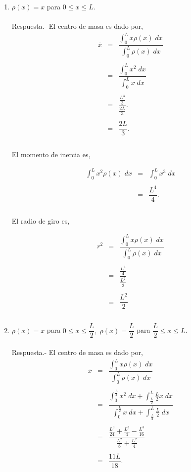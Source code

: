 \begin{enumerate}[\bfseries 1.]
\item $\rho(x)=x$ para $0\leq x \leq L$.\\\\
    Respuesta.-\; El centro de masa es dado por,
    $$\begin{array}{rcl}
	\overline{x}&=&\dfrac{\int_0^L x\rho(x)\; dx}{\int_0^L \rho(x)\; dx}\\\\
		    &=&\dfrac{\int_0^L x^2\; dx}{\int_0^L x\; dx}\\\\
		    &=&\dfrac{\frac{L^3}{3}}{\frac{2L}{3}}.\\\\
		    &=&\dfrac{2L}{3}.\\\\
    \end{array}$$

    El momento de inercia es,

    $$\begin{array}{rcl}
	\displaystyle\int_0^L x^2 \rho(x)\; dx&=&\displaystyle\int_0^L x^3\; dx\\\\
					      &=&\dfrac{L^4}{4}.\\\\
    \end{array}$$

    El radio de giro es,

    $$\begin{array}{rcl}
	r^2&=&\dfrac{\int_0^L x\rho(x)\; dx}{\int_0^L \rho(x)\; dx}\\\\
	   &=&\dfrac{\frac{L^4}{4}}{\frac{L^2}{2}}\\\\
	   &=&\dfrac{L^2}{2}\\\\
    \end{array}$$

\item $\rho(x)=x$ para $0\leq x \leq \dfrac{L}{2},$ $\rho(x)=\dfrac{L}{2}$ para $\dfrac{L}{2}\leq x \leq L$.\\\\ 
    Respuesta.-\; El centro de masa es dado por,
    $$\begin{array}{rcl}
	\overline{x}&=&\dfrac{\int_0^L x\rho(x)\; dx}{\int_0^L \rho(x)\; dx}\\\\
		    &=&\dfrac{\int_0^{\frac{L}{2}}x^2\; dx + \int_{\frac{L}{2}}^L \frac{L}{2} x\; dx}{\int_0^{\frac{L}{2}}x\; dx + \int_{\frac{L}{2}}^L \frac{L}{2}\; dx}\\\\
		    &=&\dfrac{\frac{L^3}{24}+\frac{L^3}{4}-\frac{L^3}{16}}{\frac{L^2}{8}+\frac{L^2}{4}}\\\\
		    &=&\dfrac{11L}{18}.\\\\
    \end{array}$$


\end{enumerate}
